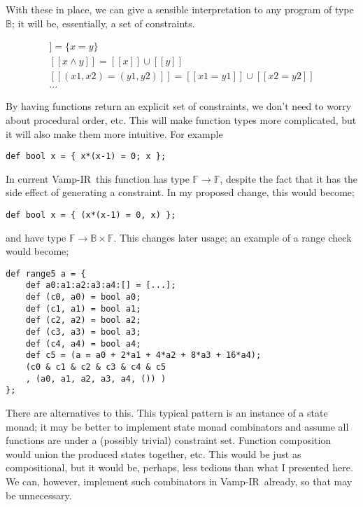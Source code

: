\documentclass{msc}
\newcommand{\vampir}{Vamp-IR}
\begin{document}
With these in place, we can give a sensible interpretation to any program of type $\mathbb{B}$; it will be, essentially, a set of constraints.

\begin{align*}
    [[ x = y ]] = \{x = y\}\\
    [[ x \wedge y ]] = [[x]] \cup [[y]]\\
    [[ (x1, x2) = (y1, y2) ]] = [[x1 = y1]] \cup [[x2 = y2]]\\
    ...
\end{align*}

By having functions return an explicit set of constraints, we don't need to worry about procedural order, etc. This will make function types more complicated, but it will also make them more intuitive. For example

\begin{verbatim}
def bool x = { x*(x-1) = 0; x };
\end{verbatim}

In current \vampir\ this function has type $\mathbb{F} \rightarrow \mathbb{F}$, despite the fact that it has the side effect of generating a constraint. In my proposed change, this would become;

\begin{verbatim}
def bool x = { (x*(x-1) = 0, x) };
\end{verbatim}

and have type $\mathbb{F} \rightarrow \mathbb{B} \times \mathbb{F}$. This changes later usage; an example of a range check would become;

\begin{verbatim}
def range5 a = {
    def a0:a1:a2:a3:a4:[] = [...];
    def (c0, a0) = bool a0;
    def (c1, a1) = bool a1;
    def (c2, a2) = bool a2;
    def (c3, a3) = bool a3;
    def (c4, a4) = bool a4;
    def c5 = (a = a0 + 2*a1 + 4*a2 + 8*a3 + 16*a4);
    (c0 & c1 & c2 & c3 & c4 & c5
    , (a0, a1, a2, a3, a4, ()) )
};
\end{verbatim}

There are alternatives to this. This typical pattern is an instance of a state monad; it may be better to implement state monad combinators and assume all functions are under a (possibly trivial) constraint set. Function composition would union the produced states together, etc. This would be just as compositional, but it would be, perhaps, less tedious than what I presented here. We can, however, implement such combinators in \vampir\ already, so that may be unnecessary.
\end{document}
